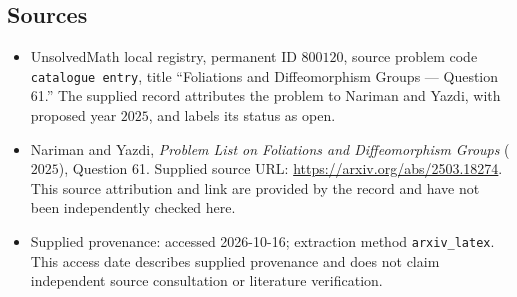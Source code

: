 \documentclass[11pt]{article}
\begin{document}
\subsection{Sources}
\begin{itemize}
\item UnsolvedMath local registry, permanent ID $800120$, source problem code \texttt{catalogue entry}, title ``Foliations and Diffeomorphism Groups --- Question 61.'' The supplied record attributes the problem to Nariman and Yazdi, with proposed year $2025$, and labels its status as open.
\item Nariman and Yazdi, \emph{Problem List on Foliations and Diffeomorphism Groups} ($2025$), Question 61. Supplied source URL: \url{https://arxiv.org/abs/2503.18274}. This source attribution and link are provided by the record and have not been independently checked here.
\item Supplied provenance: accessed 2026-10-16; extraction method \texttt{arxiv\_latex}. This access date describes supplied provenance and does not claim independent source consultation or literature verification.
\end{itemize}
\end{document}
